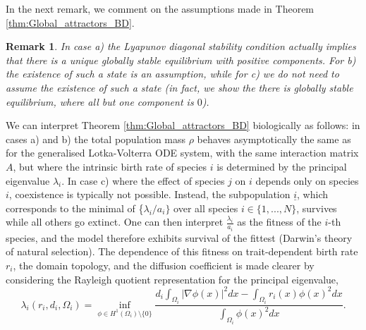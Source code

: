 \documentclass{article}
\newtheorem{rmk}{Remark}[section]
\begin{document}
In the next remark, we comment on the assumptions made in Theorem \ref{thm:Global_attractors_BD}.
\begin{rmk}
\label{rem: assumptions}
In case a) the Lyapunov diagonal stability condition actually implies that there is a unique globally stable equilibrium with positive components. For b) the existence of such a state is an assumption, while for c) we do not need to assume the existence of such a state (in fact, we show the there is globally stable equilibrium, where all but one component is $0$).
\end{rmk}
We can interpret Theorem \ref{thm:Global_attractors_BD} biologically as follows: in cases a) and b) the total population mass $\rho$ behaves asymptotically the same as for the generalised Lotka-Volterra ODE system, with the same interaction matrix $A$, but where the intrinsic birth rate of species $i$ is determined by the principal eigenvalue $\lambda_i$. In case c) where the effect of species $j$ on $i$ depends only on species $i$, coexistence is typically not possible. Instead, the subpopulation $\underline{i}$, which corresponds to the minimal of \{$\lambda_i/a_i\}$ over all species $i\in\{1,...,N\}$, survives while all others go extinct. One can then interpret $\frac{\lambda_i}{a_i}$ as the fitness of the $i$-th species, and the model therefore exhibits survival of the fittest (Darwin's theory of natural selection).  The dependence of this fitness on trait-dependent birth rate $r_i$, the domain topology, and the diffusion coefficient is made clearer by considering the Rayleigh quotient representation for the principal eigenvalue,
\begin{equation}\label{eqn:Rayleigh}
    \lambda_i(r_i,d_i,\Omega_i)=\inf_{\phi\in{}H^1(\Omega_i)\setminus\{0\}}\frac{d_i\int_{\Omega_i}|\nabla\phi(x)|^2dx-\int_{\Omega_i}r_i(x)\phi(x)^2dx}{\int_{\Omega_i}\phi(x)^2dx}.
\end{equation}
\end{document}
